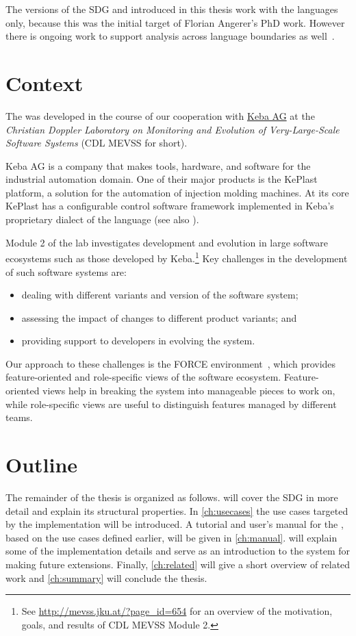 The versions of the SDG and \SB introduced in this thesis work with the \IEC languages only, because this was the 
initial target of Florian Angerer's PhD work. However there is ongoing work to support analysis across language 
boundaries as well~\cite{DBLP:conf/kbse/Angerer14}.


\section{Context}

The \SB was developed in the course of our cooperation with \href{http://www.keba.com}{Keba AG} at the \emph{Christian 
Doppler Laboratory on Monitoring and Evolution of Very-Large-Scale Software Systems} (CDL MEVSS for short).

Keba AG is a company that makes tools, hardware, and software for the industrial automation domain. One of their major 
products is the KePlast platform, a solution for the automation of injection molding machines. At its core KePlast has 
a configurable control software framework implemented in Keba's proprietary dialect of the \IEC language (see also 
\cite[sec.~3.1]{DBLP:conf/splc/AngererPLGG14}).

Module 2 of the lab investigates development and evolution in large software ecosystems such as those developed by 
Keba.\footnote{See \url{http://mevss.jku.at/?page_id=654} for an overview of the motivation, goals, and results of CDL 
MEVSS Module 2.}
Key challenges in the development of such software systems are:

\begin{itemize}
  \item dealing with different variants and version of the software system;
  \item assessing the impact of changes to different product variants; and
  \item providing support to developers in evolving the system.
\end{itemize}

Our approach to these challenges is the FORCE environment~\cite{HinterreiterDA}, which provides feature-oriented and 
role-specific views of the software ecosystem. Feature-oriented views help in breaking the system into manageable 
pieces to work on, while role-specific views are useful to distinguish features managed by different teams.


\section{Outline}

The remainder of the thesis is organized as follows.
 will cover the SDG in more detail and explain its structural properties.
In \autoref{ch:usecases} the use cases targeted by the \SB implementation will be introduced.
A tutorial and user's manual for the \SB, based on the use cases defined earlier, will be given in \autoref{ch:manual}.
 will explain some of the implementation details and serve as an introduction to the system for making
future extensions.
Finally, \autoref{ch:related} will give a short overview of related work and \autoref{ch:summary} will conclude the 
thesis.
